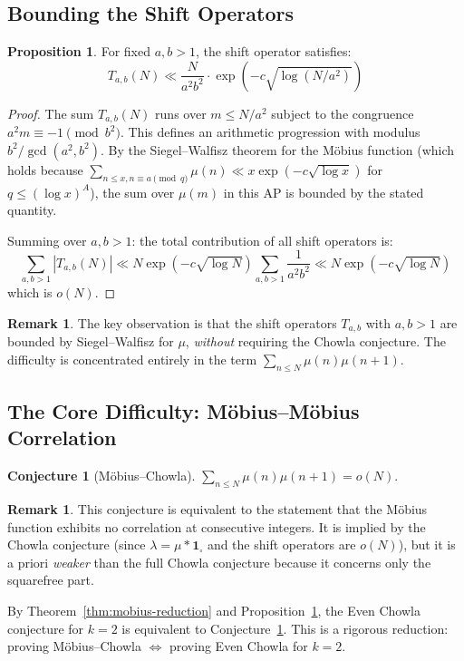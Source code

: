 \documentclass[11pt,a4paper]{article}
\theoremstyle{definition}
\newtheorem{proposition}[theorem]{Proposition}
\newtheorem{conjecture}[theorem]{Conjecture}
\newtheorem{remark}[theorem]{Remark}
\begin{document}
\subsection{Bounding the Shift Operators}

\begin{proposition}
\label{prop:shift-bound}
For fixed $a, b > 1$, the shift operator satisfies:
\begin{equation}
T_{a,b}(N) \ll \frac{N}{a^2 b^2} \cdot \exp\!\left(-c\sqrt{\log(N/a^2)}\right)
\end{equation}
\end{proposition}

\begin{proof}
The sum $T_{a,b}(N)$ runs over $m \le N/a^2$ subject to the congruence $a^2 m \equiv -1 \pmod{b^2}$. This defines an arithmetic progression with modulus $b^2/\gcd(a^2, b^2)$. By the Siegel--Walfisz theorem for the M\"obius function (which holds because $\sum_{n \le x, n \equiv a \pmod q} \mu(n) \ll x \exp(-c\sqrt{\log x})$ for $q \le (\log x)^A$), the sum over $\mu(m)$ in this AP is bounded by the stated quantity.

Summing over $a, b > 1$: the total contribution of all shift operators is:
\begin{equation}
\sum_{a,b > 1} |T_{a,b}(N)| \ll N \exp(-c\sqrt{\log N}) \sum_{a,b > 1} \frac{1}{a^2 b^2} \ll N \exp(-c\sqrt{\log N})
\end{equation}
which is $o(N)$.
\end{proof}

\begin{remark}
The key observation is that the shift operators $T_{a,b}$ with $a, b > 1$ are bounded by Siegel--Walfisz for $\mu$, \emph{without} requiring the Chowla conjecture. The difficulty is concentrated entirely in the term $\sum_{n \le N} \mu(n)\mu(n+1)$.
\end{remark}

\subsection{The Core Difficulty: M\"obius--M\"obius Correlation}

\begin{conjecture}[M\"obius--Chowla]
\label{conj:mobius-chowla}
$\sum_{n \le N} \mu(n)\mu(n+1) = o(N)$.
\end{conjecture}

\begin{remark}
This conjecture is equivalent to the statement that the M\"obius function exhibits no correlation at consecutive integers. It is implied by the Chowla conjecture (since $\lambda = \mu * \mathbf{1}_\square$ and the shift operators are $o(N)$), but it is a priori \emph{weaker} than the full Chowla conjecture because it concerns only the squarefree part.

By Theorem~\ref{thm:mobius-reduction} and Proposition~\ref{prop:shift-bound}, the Even Chowla conjecture for $k = 2$ is equivalent to Conjecture~\ref{conj:mobius-chowla}. This is a rigorous reduction: proving M\"obius--Chowla $\iff$ proving Even Chowla for $k = 2$.
\end{remark}
\end{document}
